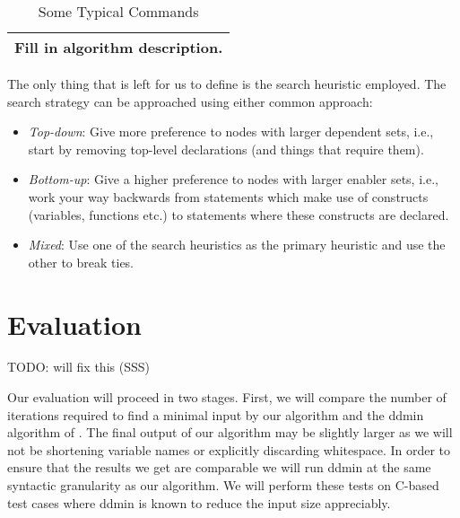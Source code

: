 \documentclass[preprint]{acm_proc_article-sp}
\begin{document}
\begin{table*}
\centering
\begin{tabular}{| p{} |} \hline
Fill in algorithm description.


\\  \hline
\end{tabular}
\caption{Some Typical Commands}
\label{tbl:sddmin}
\end{table*}


The only thing that is left for us to define is the search heuristic
employed. The search strategy can be approached using either common approach:
\begin{itemize}
\item \emph{Top-down}: Give more preference to nodes with larger dependent
  sets, i.e., start by removing top-level declarations (and things that
  require them).
\item \emph{Bottom-up}: Give a higher preference to nodes with larger enabler
  sets, i.e., work your way backwards from statements which make use of
  constructs (variables, functions etc.) to statements where these constructs
  are declared.
\item \emph{Mixed}: Use one of the search heuristics as the primary heuristic
  and use the other to break ties.
\end{itemize}



\section{Evaluation}
TODO: will fix this (SSS)

Our evaluation will proceed in two stages.  First, we will compare the number of
iterations required to find a minimal input by our algorithm and the ddmin
algorithm of \citeauthor{dd}.  The final output of our algorithm may be slightly
larger as we will not be shortening variable names or explicitly discarding
whitespace.  In order to ensure that the results we get are comparable we will
run ddmin at the same syntactic granularity as our algorithm. We will perform
these tests on C-based test cases where ddmin is known to reduce the input size
appreciably.
\end{document}
